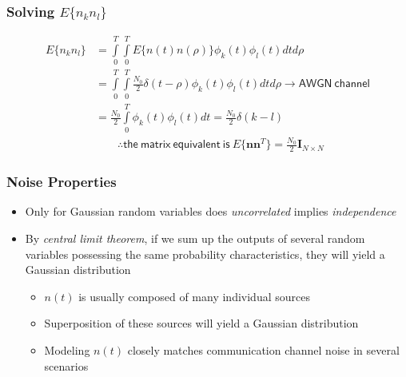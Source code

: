 \documentclass[10pt]{beamer}
\begin{document}
\frame
{
  \frametitle{Solving $E\{n_kn_l\}$}

  \begin{equation}
    \begin{split}
        E\{n_kn_l\}&=\int\limits_0^T\int\limits_0^TE\{n(t)n(\rho)\}\phi_k(t)\phi_l(t)dtd\rho\\
        &=\int\limits_0^T\int\limits_0^T\frac{N_0}{2}\delta(t-\rho)\phi_k(t)\phi_l(t)dtd\rho\rightarrow\mathsf{AWGN~channel}\\
        &=\frac{N_0}{2}\int\limits_0^T\phi_k(t)\phi_l(t)dt=\frac{N_0}{2}\delta(k-l)\\
        &\qquad\therefore\mathsf{the~matrix~equivalent~is}~{E\{\mathbf{n}\mathbf{n}^T\}}=\frac{N_0}{2}\mathbf{I}_{N\times{N}}\nonumber
    \end{split}
  \end{equation}
}
\frame
{
  \frametitle{Noise Properties}

  \begin{itemize}
    \item Only for Gaussian random variables does {\it uncorrelated} implies {\it independence}
    \item By {\it central limit theorem}, if we sum up the outputs of several random variables possessing the same probability characteristics, they will yield a Gaussian distribution
    \begin{itemize}
        \item $n(t)$ is usually composed of many individual sources
        \item Superposition of these sources will yield a Gaussian distribution
        \item Modeling $n(t)$ closely matches communication channel noise in several scenarios
    \end{itemize} 
  \end{itemize}

}
\frame
\end{document}
